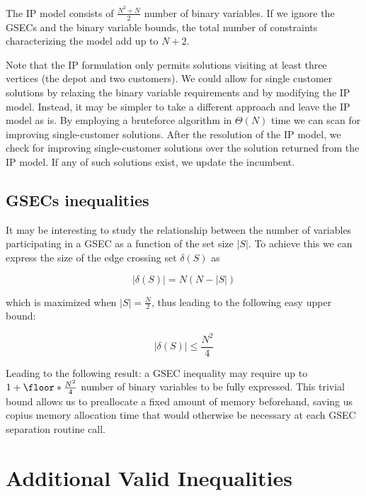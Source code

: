 The IP model consists of $\frac{N^2 + N}{2}$ number of binary variables.
If we ignore the GSECs and the binary variable bounds, the total number of constraints characterizing the model add up to $N + 2$.

Note that the IP formulation only permits solutions visiting at least three vertices (the depot and two customers).
We could allow for single customer solutions by relaxing the binary variable requirements and by modifying the IP model.
Instead, it may be simpler to take a different approach and leave the IP model as is.
By employing a bruteforce algorithm in $\Theta(N)$ time we can scan for improving single-customer solutions.
After the resolution of the IP model, we check for improving single-customer solutions over the solution returned from the IP model.
If any of such solutions exist, we update the incumbent.

\subsection{GSECs inequalities}



It may be interesting to study the relationship between the number of variables participating in a GSEC as a function of the set size $|S|$.
To achieve this we can express the size of the edge crossing set $\delta(S)$ as

\begin{equation}\label{eq:delta-s-set-size}
	|\delta(S)| = N (N - |S|)
\end{equation}

which is maximized when $|S| = \frac{N}{2}$, thus leading to the following easy upper bound:

\begin{equation}\label{eq:delta-s-set-size-ub}
	|\delta(S)| \le \frac{N^2}{4}
\end{equation}

Leading to the following result: a GSEC inequality may require up to $1 + \floor*{\frac{N^2}{4}}$ number of binary variables to be fully expressed.
This trivial bound allows us to preallocate a fixed amount of memory beforehand, saving us copius memory allocation time that would otherwise be necessary at each GSEC separation routine call.

\section{Additional Valid Inequalities}

